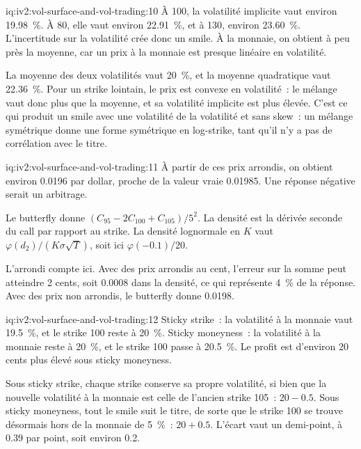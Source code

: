 \begin{solution}{iq:iv2:vol-surface-and-vol-trading:10}
À 100, la volatilité implicite vaut environ 19.98~\%. À 80, elle vaut environ 22.91~\%, et à 130, environ 23.60~\%. L'incertitude sur la volatilité crée donc un smile. À la monnaie, on obtient à peu près la moyenne, car un prix à la monnaie est presque linéaire en volatilité.

La moyenne des deux volatilités vaut 20~\%, et la moyenne quadratique vaut 22.36~\%. Pour un strike lointain, le prix est convexe en volatilité~: le mélange vaut donc plus que la moyenne, et sa volatilité implicite est plus élevée. C'est ce qui produit un smile avec une volatilité de la volatilité et sans skew~: un mélange symétrique donne une forme symétrique en log-strike, tant qu'il n'y a pas de corrélation avec le titre.

\end{solution}

\begin{solution}{iq:iv2:vol-surface-and-vol-trading:11}
À partir de ces prix arrondis, on obtient environ 0.0196 par dollar, proche de la valeur vraie 0.01985. Une réponse négative serait un arbitrage.

Le butterfly donne $(C_{95} - 2C_{100} + C_{105})/5^2$. La densité est la dérivée seconde du call par rapport au strike. La densité lognormale en $K$ vaut $\varphi(d_2)/(K\sigma\sqrt T)$, soit ici $\varphi(-0.1)/20$.

L'arrondi compte ici. Avec des prix arrondis au cent, l'erreur sur la somme peut atteindre 2 cents, soit 0.0008 dans la densité, ce qui représente 4~\% de la réponse. Avec des prix non arrondis, le butterfly donne 0.0198.

\end{solution}

\begin{solution}{iq:iv2:vol-surface-and-vol-trading:12}
Sticky strike~: la volatilité à la monnaie vaut 19.5~\%, et le strike 100 reste à 20~\%. Sticky moneyness~: la volatilité à la monnaie reste à 20~\%, et le strike 100 passe à 20.5~\%. Le profit est d'environ 20 cents plus élevé sous sticky moneyness.

Sous sticky strike, chaque strike conserve sa propre volatilité, si bien que la nouvelle volatilité à la monnaie est celle de l'ancien strike 105~: $20 - 0.5$. Sous sticky moneyness, tout le smile suit le titre, de sorte que le strike 100 se trouve désormais hors de la monnaie de 5~\%~: $20 + 0.5$. L'écart vaut un demi-point, à 0.39 par point, soit environ 0.2.

\end{solution}


